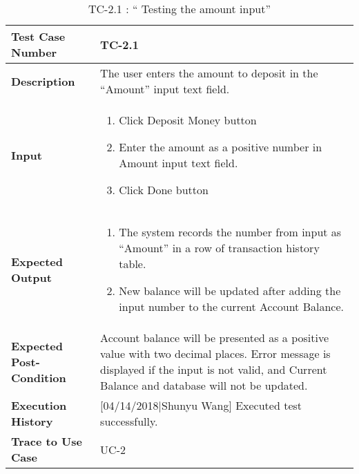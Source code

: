 \documentclass[12pt]{article}
\begin{document}
\begin{table}[H]
\caption{TC-2.1 : “ Testing the amount input”}
\begin{center}
\begin{tabular}{|p{5	cm}|p{12cm}|}
\hline
\bf Test Case Number & 
TC-2.1 \\
\hline
\bf Description & 
The user enters the amount to deposit in the “Amount” input text field.\\
\hline
\bf Input & 
\begin{enumerate}
  \item Click Deposit Money button
  \item Enter the amount as a positive number in Amount input text field.
  \item Click Done button
\end{enumerate} \\
\hline
\bf Expected Output & 
\begin{enumerate}
  \item The system records the number from input as “Amount” in a row of transaction history table.
  \item New balance will be updated after adding the input number to the current Account Balance.
\end{enumerate} \\
\hline
\bf Expected Post-Condition & 
Account balance will be presented as a positive value with two decimal places. Error message is displayed if the input is not valid, and Current Balance and database will not be updated.\\
\hline
\bf Execution History & 
[04/14/2018|Shunyu Wang] Executed test successfully.\\
\hline
\bf Trace to Use Case & 
UC-2\\
\hline

\end{tabular}
\end{center}
\end{table}
\end{document}
